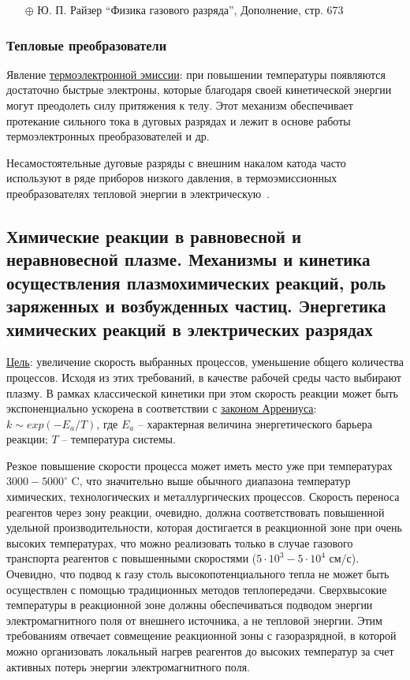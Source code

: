\documentclass[10pt, a4paper]{article}
\begin{document}
\begin{itemize}
	\item[$\oplus$] Ю. П. Райзер ``Физика газового разряда'', Дополнение, стр. 673
\end{itemize}

\subsubsection{Тепловые преобразователи}

Явление \uline{термоэлектронной эмиссии}: при повышении температуры появляются достаточно быстрые электроны, которые благодаря своей кинетической энергии могут преодолеть силу притяжения к телу. Этот механизм обеспечивает протекание сильного тока в дуговых разрядах и лежит в основе работы термоэлектронных преобразователей и др.~\cite{raizer}

Несамостоятельные дуговые разряды с внешним накалом катода
часто используют в ряде приборов низкого давления, в термоэмиссионных преобразователях тепловой энергии в электрическую~\cite{raizer}.

\subsection{Химические реакции в равновесной и неравновесной плазме. Механизмы и кинетика осуществления плазмохимических реакций, роль заряженных и возбужденных частиц. Энергетика химических реакций в электрических разрядах}

\uline{Цель}: увеличение скорость выбранных процессов, уменьшение общего количества процессов. Исходя из этих требований, в качестве рабочей среды часто выбирают плазму. В рамках классической кинетики при этом скорость реакции может быть экспоненциально ускорена в соответствии с \uline{законом Аррениуса}: $k\sim exp(-E_a/T)$, где $E_a$ -- характерная величина энергетического барьера реакции; $T$ -- температура системы.
 
Резкое повышение скорости процесса может иметь место уже при температурах $3000-5000^\circ$ C, что значительно выше обычного диапазона температур химических, технологических и металлургических процессов. Скорость переноса реагентов через зону реакции, очевидно, должна соответствовать повышенной удельной производительности, которая достигается в реакционной зоне при очень высоких температурах, что можно реализовать только в случае газового транспорта реагентов с повышенными скоростями ($5\cdot10^3-5\cdot10^4$ см/с). Очевидно, что подвод к газу столь высокопотенциального тепла не может быть осуществлен с помощью традиционных методов теплопередачи. Сверхвысокие температуры в реакционной зоне должны обеспечиваться подводом энергии электромагнитного поля от внешнего источника, а не тепловой энергии. Этим требованиям отвечает совмещение реакционной зоны с газоразрядной, в которой можно организовать локальный нагрев реагентов до высоких температур за счет активных потерь энергии электромагнитного поля.
\end{document}
